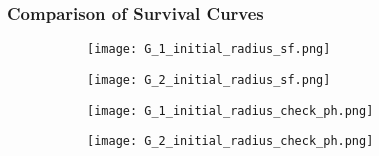      
     
   
   \subsubsection{Comparison of Survival Curves}


      \begin{figure}
        \centering      
        \begin{subfigure}[b]{0.45\textwidth}
          \texttt{[image: G\_1\_initial\_radius\_sf.png]}
          \caption{}
          \label{fig:sf_g1_branch_radius}
        \end{subfigure}
        \hfill
        \begin{subfigure}[b]{0.45\textwidth}
          \texttt{[image: G\_2\_initial\_radius\_sf.png]}
          \caption{}
          \label{fig:sf_g2_branch_radius}
        \end{subfigure}
        \caption{}
        \label{fig:sf_branch_radius}

      \end{figure}




      \begin{figure}
        \centering      
        \begin{subfigure}[b]{0.45\textwidth}
          \texttt{[image: G\_1\_initial\_radius\_check\_ph.png]}
          \caption{}
          \label{fig:g1_branch_radius_check_ph}
        \end{subfigure}
        \hfill
        \begin{subfigure}[b]{0.45\textwidth}
          \texttt{[image: G\_2\_initial\_radius\_check\_ph.png]}
          \caption{}
          \label{fig:g2_branch_radius_check_ph}
        \end{subfigure}
        \caption{}
        \label{fig:branch_radius_check_ph}
      \end{figure}

      

      
      
